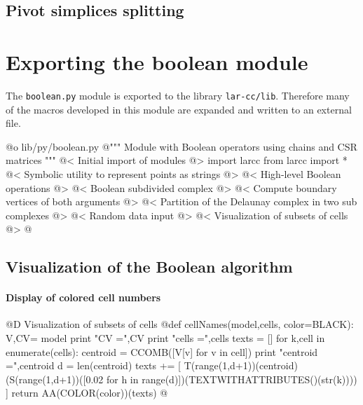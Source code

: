 \documentclass[11pt,oneside]{article}	%
\begin{document}
\subsection{Pivot simplices splitting}
\section{Exporting the boolean module}

The \texttt{boolean.py} module is exported to the library \texttt{lar-cc/lib}. Therefore many of the macros developed in this module are expanded and written to an external file.

@o lib/py/boolean.py
@{""" Module with Boolean operators using chains and CSR matrices """
@< Initial import of modules @>
import larcc
from larcc import *
@< Symbolic utility to represent points as strings @>
@< High-level Boolean operations @>
@< Boolean subdivided complex @>
@< Compute boundary vertices of both arguments @>
@< Partition of the Delaunay complex in two sub complexes @>
@< Random data input @>
@< Visualization of subsets of cells @>
@}

\subsection{Visualization of the Boolean algorithm}

\paragraph{Display of colored cell numbers}

@D Visualization of subsets of cells
@{def cellNames(model,cells, color=BLACK):
	V,CV= model
	print "\n CV =",CV
	print "\n cells =",cells
	texts = []
	for k,cell in enumerate(cells):
		centroid = CCOMB([V[v] for v in cell])
		print "centroid =",centroid
		d = len(centroid)
		texts += [ T(range(1,d+1))(centroid)(S(range(1,d+1))([0.02 
						for h in range(d)])(TEXTWITHATTRIBUTES()(str(k)))) ]
	return AA(COLOR(color))(texts)
@}
\end{document}
